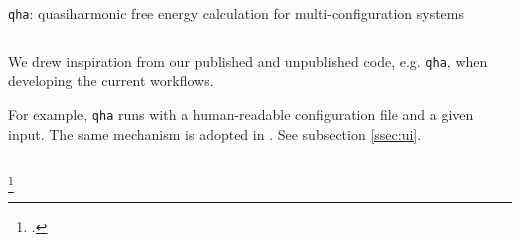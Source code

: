 \begin{frame}{\texttt{qha}: quasiharmonic free energy calculation for multi-configuration systems}
    \begin{columns}[t]
        \begin{column}[T, onlytextwidth]{0.4\textwidth} %
            We drew inspiration from our published and unpublished code, e.g.
            \texttt{qha}\footnotemark, when developing the current workflows.

            For example, \texttt{qha} runs with a human-readable
            configuration file and a given input.
            The same mechanism is adopted in \express{}.
            See subsection \ref{ssec:ui}.
        \end{column}

        \begin{column}[T]{0.5\textwidth}
        \end{column}
    \end{columns}
    \footcitetext{QIN2019199}

\end{frame}
